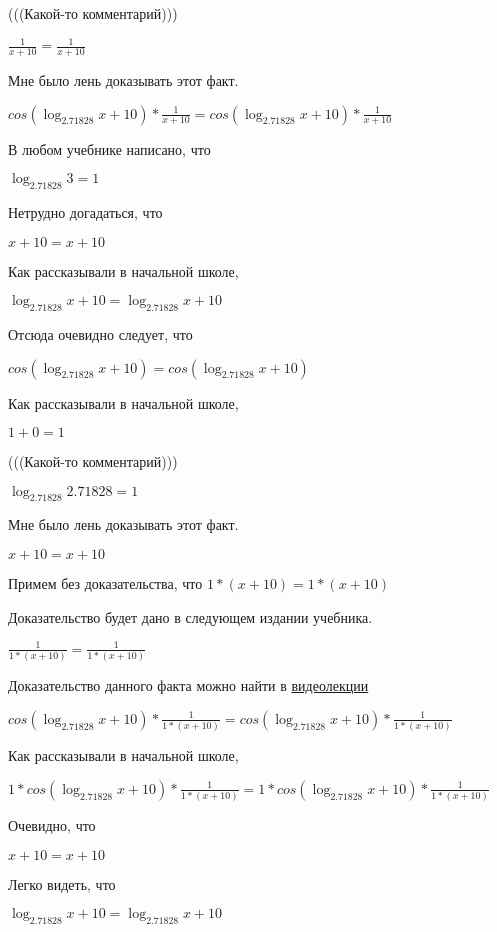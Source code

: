 \documentclass[12pt,a4paper,fleqn]{article}
\theoremstyle{definition}
\begin{document}
(((Какой-то комментарий)))

$\frac{ 1 }{ x  +  10 }
 = \frac{ 1 }{ x  +  10 }
$

Мне было лень доказывать этот факт.

$cos(\log_{ 2.71828 }{ x  +  10 }) * \frac{ 1 }{ x  +  10 }
 = cos(\log_{ 2.71828 }{ x  +  10 }) * \frac{ 1 }{ x  +  10 }
$

В любом учебнике написано, что

$\log_{ 2.71828 }{ 3 } =  1 $

Нетрудно догадаться, что

$ x  +  10  =  x  +  10 $

Как рассказывали в начальной школе,

$\log_{ 2.71828 }{ x  +  10 } = \log_{ 2.71828 }{ x  +  10 }$

Отсюда очевидно следует, что

$cos(\log_{ 2.71828 }{ x  +  10 }) = cos(\log_{ 2.71828 }{ x  +  10 })$

Как рассказывали в начальной школе,

$ 1  +  0  =  1 $

(((Какой-то комментарий)))

$\log_{ 2.71828 }{ 2.71828 } =  1 $

Мне было лень доказывать этот факт.

$ x  +  10  =  x  +  10 $

Примем без доказательства, что
$ 1  * ( x  +  10 ) =  1  * ( x  +  10 )$

Доказательство будет дано в следующем издании учебника.

$\frac{ 1 }{ 1  * ( x  +  10 )}
 = \frac{ 1 }{ 1  * ( x  +  10 )}
$

Доказательство данного факта можно найти в \href{https://www.youtube.com/watch?v=dQw4w9WgXcQ}{видеолекции}

$cos(\log_{ 2.71828 }{ x  +  10 }) * \frac{ 1 }{ 1  * ( x  +  10 )}
 = cos(\log_{ 2.71828 }{ x  +  10 }) * \frac{ 1 }{ 1  * ( x  +  10 )}
$

Как рассказывали в начальной школе,

$ 1  * cos(\log_{ 2.71828 }{ x  +  10 }) * \frac{ 1 }{ 1  * ( x  +  10 )}
 =  1  * cos(\log_{ 2.71828 }{ x  +  10 }) * \frac{ 1 }{ 1  * ( x  +  10 )}
$

Очевидно, что

$ x  +  10  =  x  +  10 $

Легко видеть, что

$\log_{ 2.71828 }{ x  +  10 } = \log_{ 2.71828 }{ x  +  10 }$
\end{document}

